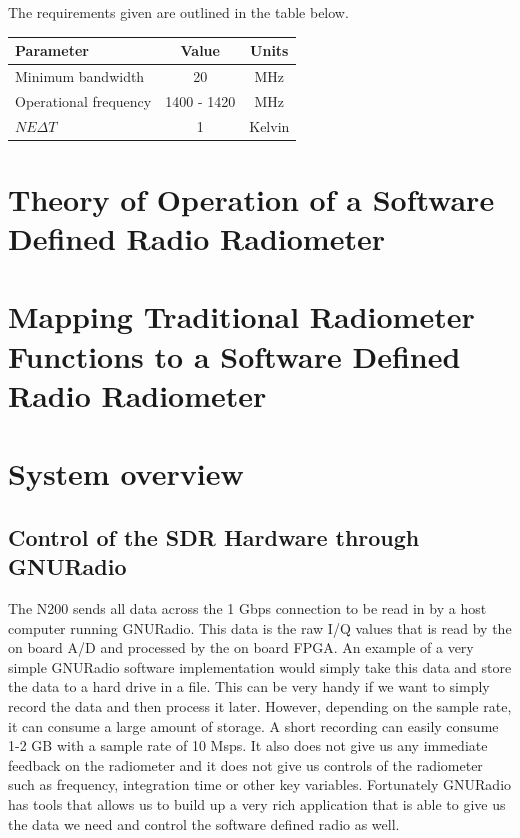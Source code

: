 The requirements given are outlined in the table below.

\begin{table}[h!tb] \centering
{}
\label{rad_performance}
\begin{tabular}{lcc} \hline
\textbf{Parameter} & \textbf{Value} & \textbf{Units} \\ \hline
Minimum bandwidth & 20 & MHz \\
Operational frequency & 1400 - 1420 & MHz \\
$NE\Delta T$ & 1 & Kelvin \\ \hline
\end{tabular}
\end{table}

\section{Theory of Operation of a Software Defined Radio Radiometer}

\section{Mapping Traditional Radiometer Functions to a Software Defined Radio Radiometer}

\section{System overview}

\subsection{Control of the SDR Hardware through GNURadio}
The N200 sends all data across the 1 Gbps connection to be read in by a host computer running GNURadio.  This data is the raw I/Q values that is read by the on board A/D and processed by the on board FPGA.  An example of a very simple GNURadio software implementation would simply take this data and store the data to a hard drive in a file.  This can be very handy if we want to simply record the data and then process it later.  However, depending on the sample rate, it can consume a large amount of storage.  A short recording can easily consume 1-2 GB with a sample rate of 10 Msps.  It also does not give us any immediate feedback on the radiometer and it does not give us controls of the radiometer such as frequency, integration time or other key variables.  Fortunately GNURadio has tools that allows us to build up a very rich application that is able to give us the data we need and control the software defined radio as well.

